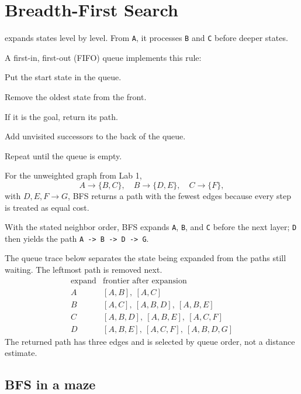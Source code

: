 \section{Breadth-First Search}

 expands states level by level. From \texttt{A}, it processes \texttt{B} and \texttt{C} before deeper states.

A first-in, first-out (FIFO) queue implements this rule:

\begin{mlsteps}
  \item Put the start state in the queue.
  \item Remove the oldest state from the front.
  \item If it is the goal, return its path.
  \item Add unvisited successors to the back of the queue.
  \item Repeat until the queue is empty.
\end{mlsteps}

For the unweighted graph from Lab 1,
\[
A\rightarrow\{B,C\},\quad B\rightarrow\{D,E\},\quad C\rightarrow\{F\},
\]
with \(D,E,F\rightarrow G\), BFS returns a path with the fewest edges because every step is treated as equal cost.

\begin{workedexample}
With the stated neighbor order, BFS expands \texttt{A}, \texttt{B}, and \texttt{C} before the next layer; \texttt{D} then yields the path \texttt{A -> B -> D -> G}.

The queue trace below separates the state being expanded from the paths still waiting. The leftmost path is removed next.
\[
\begin{array}{c|l}
\text{expand} & \text{frontier after expansion} \\
\hline
A & [A,B],\ [A,C] \\
B & [A,C],\ [A,B,D],\ [A,B,E] \\
C & [A,B,D],\ [A,B,E],\ [A,C,F] \\
D & [A,B,E],\ [A,C,F],\ [A,B,D,G]
\end{array}
\]
The returned path has three edges and is selected by queue order, not a distance estimate.
\end{workedexample}

\subsection{BFS in a maze}

